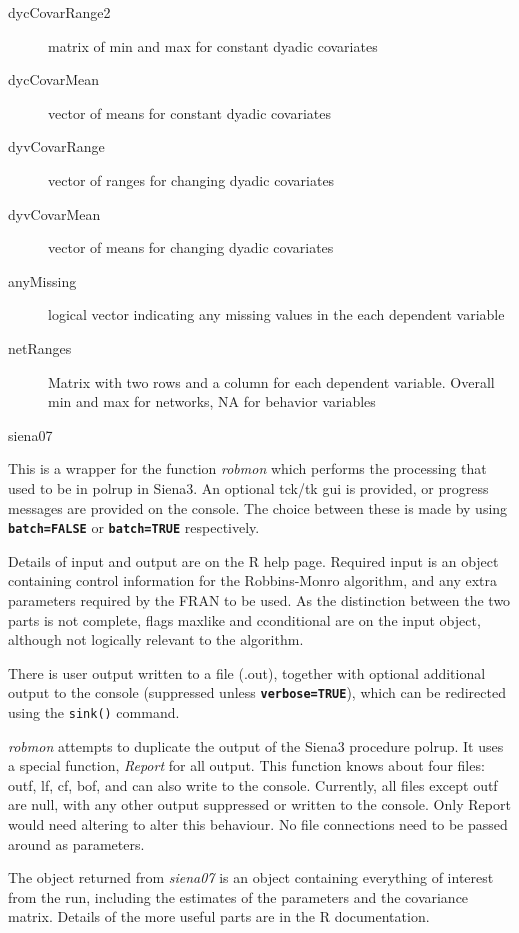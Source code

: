\documentclass[12pt,a4paper]{article}
\makeatletter
\renewcommand{\=}{\,=\,}
\newcommand{\+}{\,+\,}
\newcommand{\nm}[1]{\textsf{ #1}}
\newcommand{\nnm}[1]{\textsf{\textit{#1}}}
\newcommand{\nmm}[1]{\nnm{#1}}
\renewcommand{\section}{\@startsection{section}{1}
                {0pt}{\baselineskip}{0.5\baselineskip}
                {\centering\sffamily} }
\newcommand{\sfn}[1]{\textbf{\texttt{#1}}}
\newcommand{\R}{{\sf R }}
\newcommand{\SI}{{\sf Siena3 }}
\newcommand{\Sn}{{\sf Siena3}}
\makeatother
\begin{document}
\begin{description}
\item[dycCovarRange2] matrix of min and max for constant dyadic covariates
\item[dycCovarMean] vector of means for constant dyadic covariates
\item[dyvCovarRange] vector of ranges for changing dyadic covariates
\item[dyvCovarMean] vector of means for changing dyadic covariates
\item[anyMissing] logical vector indicating any missing values in the each
  dependent variable
\item[netRanges] Matrix with two rows and a column for each dependent
  variable. Overall min and max for networks, NA for behavior variables
\end{description}


\section{siena07}

This is a wrapper for the function \nmm{robmon} which performs the processing
that used to be in \nm{polrup} in \Sn.  An optional tck/tk gui is provided,
or progress messages are provided on the console. The choice between these is
made by using \sfn{batch=FALSE} or \sfn{batch=TRUE} respectively.

Details of input and output are on the \R help page. Required input is an object
containing control information for the Robbins-Monro algorithm, and any extra
parameters required by the \nm{FRAN} to be used. As the distinction between the
two parts is not complete, flags \nm{maxlike} and \nm{cconditional} are on the
input object, although not logically relevant to the algorithm.

There is user output written to a file (.out), together with optional additional
output to the console (suppressed unless \sfn{verbose=TRUE}), which can be
redirected using the \verb|sink()| command.

\nnm{robmon} attempts to duplicate the output of
the \SI procedure \nm{polrup}. It uses
a special function, \nnm{Report} for all output.
This function knows about four files:
\nm{outf}, \nm{lf}, \nm{cf}, \nm{bof}, and can also write to the console.
Currently, all files except \nm{outf} are null, with any other output suppressed
or written to the console. Only \nm{Report} would need altering to alter this
behaviour.  No file connections need to be passed around as parameters.

The object returned from \nnm{siena07} is an object containing everything of
interest from the run, including the estimates of the parameters and the
covariance matrix.  Details of the more useful parts are in the \R
documentation.
\end{document}
